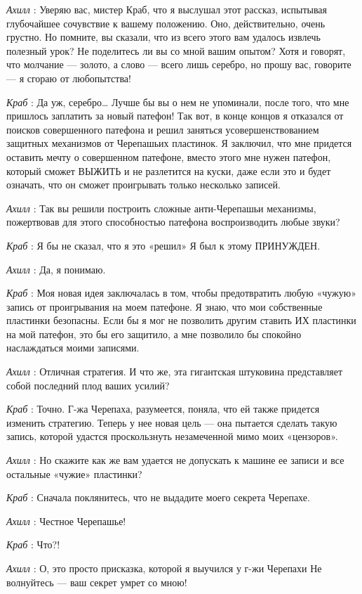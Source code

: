 \emph{Ахилл} : Уверяю вас, мистер Краб, что я выслушал этот рассказ, испытывая глубочайшее сочувствие к вашему положению. Оно, действительно, очень грустно. Но помните, вы сказали, что из всего этого вам удалось извлечь полезный урок? Не поделитесь ли вы со мной вашим опытом? Хотя и говорят, что молчание --- золото, а слово --- всего лишь серебро, но прошу вас, говорите --- я сгораю от любопытства!

\emph{Краб} : Да уж, серебро\ldots{} Лучше бы вы о нем не упоминали, после того, что мне пришлось заплатить за новый патефон! Так вот, в конце концов я отказался от поисков совершенного патефона и решил заняться усовершенствованием защитных механизмов от Черепашьих пластинок. Я заключил, что мне придется оставить мечту о совершенном патефоне, вместо этого мне нужен патефон, который сможет ВЫЖИТЬ и не разлетится на куски, даже если это и будет означать, что он сможет проигрывать только несколько записей.

\emph{Ахилл} : Так вы решили построить сложные анти-Черепашьи механизмы, пожертвовав для этого способностью патефона воспроизводить любые звуки?

\emph{Краб} : Я бы не сказал, что я это «решил» Я был к этому ПРИНУЖДЕН.

\emph{Ахилл} : Да, я понимаю.

\emph{Краб} : Моя новая идея заключалась в том, чтобы предотвратить любую «чужую» запись от проигрывания на моем патефоне. Я знаю, что мои собственные пластинки безопасны. Если бы я мог не позволить другим ставить ИХ пластинки на мой патефон, это бы его защитило, а мне позволило бы спокойно наслаждаться моими записями.

\emph{Ахилл} : Отличная стратегия. И что же, эта гигантская штуковина представляет собой последний плод ваших усилий?

\emph{Краб} : Точно. Г-жа Черепаха, разумеется, поняла, что ей также придется изменить стратегию. Теперь у нее новая цель --- она пытается сделать такую запись, которой удастся проскользнуть незамеченной мимо моих «цензоров».

\emph{Ахилл} : Но скажите как же вам удается не допускать к машине ее записи и все остальные «чужие» пластинки?

\emph{Краб} : Сначала поклянитесь, что не выдадите моего секрета Черепахе.

\emph{Ахилл} : Честное Черепашье!

\emph{Краб} : Что?!

\emph{Ахилл} : О, это просто присказка, которой я выучился у г-жи Черепахи Не волнуйтесь --- ваш секрет умрет со мною!

